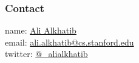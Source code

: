 \documentclass{beamer}
\begin{document}

\begin{frame}
  \frametitle{Contact}
    name: \href{https://ali-alkhatib.com}{Ali Alkhatib} \\
    email: \href{mailto:ali.alkhatib@cs.stanford.edu}{ali.alkhatib@cs.stanford.edu} \\
    twitter: \href{https://twitter.com/_alialkhatib}{@\_alialkhatib} \\
\end{frame}


%   
%   
\end{document}
